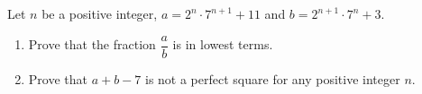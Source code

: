 Let $n$ be a positive integer, $a=2^n\cdot7^{n+1}+11$ and $b=2^{n+1}\cdot7^n+3$.
\begin{enumerate}
\item[(a)] Prove that the fraction $\dfrac {a}{b}$ is in lowest terms.
\item[(b)] Prove that $a+b-7$ is not a perfect square for any positive integer $n$.
\end{enumerate}
